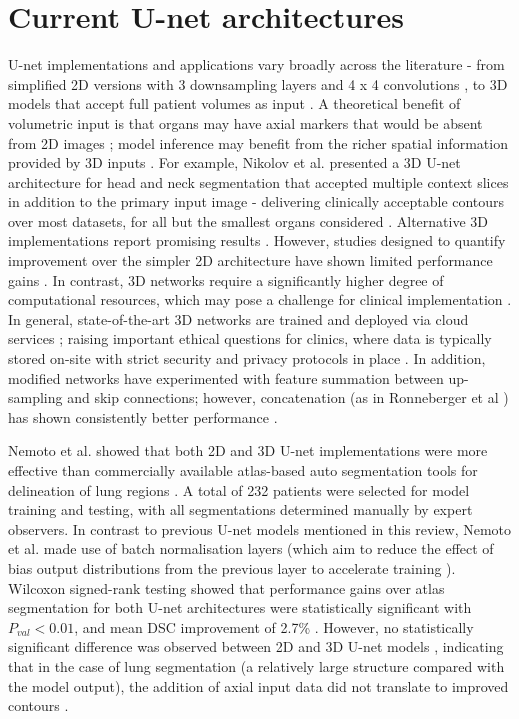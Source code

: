 \section{Current U-net architectures}
U-net implementations and applications vary broadly across the literature - from simplified 2D versions with 3 downsampling layers and 4 x 4 convolutions \cite{Nemoto_2020}, to 3D models that accept full patient volumes as input \cite{Zhu_2018}. A theoretical benefit of volumetric input is that organs may have axial markers that would be absent from 2D images \cite{Hesamian2019}; model inference may benefit from the richer spatial information provided by 3D inputs \cite{Nemoto_2020}. For example, Nikolov et al. presented a 3D U-net architecture for head and neck segmentation that accepted multiple context slices in addition to the primary input image \cite{Nikolov_2018} - delivering clinically acceptable contours over most datasets, for all but the smallest organs considered \cite{Nikolov_2018}. Alternative 3D implementations report promising results \cite{ Nikolov_2018, Zhu_2018, _i_ek_2016}. However, studies designed to quantify improvement over the simpler 2D architecture have shown limited performance gains \cite{Nemoto_2020}. In contrast, 3D networks require a significantly higher degree of computational resources, which may pose a challenge for clinical implementation \cite{Nemoto_2020}. In general, state-of-the-art 3D networks are trained and deployed via cloud services \cite{Nemoto_2020}; raising important ethical questions for clinics, where data is typically stored on-site with strict security and privacy protocols in place \cite{Nemoto_2020, Lundervold2019}. In addition, modified networks have experimented with feature summation between up-sampling and skip connections; however, concatenation (as in Ronneberger et al \cite{Ronneberger_2015}) has shown consistently better performance \cite{Zhu_2018}.

Nemoto et al. showed that both 2D and 3D U-net implementations were more effective than commercially available atlas-based auto segmentation tools for delineation of lung regions  \cite{Nemoto_2020}. A total of 232 patients were selected for model training and testing, with all segmentations determined manually by expert observers. In contrast to previous U-net models mentioned in this review, Nemoto et al. made use of batch normalisation layers (which aim to reduce the effect of bias output distributions from the previous layer to accelerate training \cite{santurkar2018}). Wilcoxon signed-rank testing showed that performance gains over atlas segmentation for both U-net architectures were statistically significant with $P_{val}<0.01$, and mean DSC improvement of 2.7\% \cite{Nemoto_2020}. However, no statistically significant difference was observed between 2D and 3D U-net models \cite{Nemoto_2020}, indicating that in the case of lung segmentation (a relatively large structure compared with the model output), the addition of axial input data did not translate to improved contours \cite{Nemoto_2020}.
%
%
